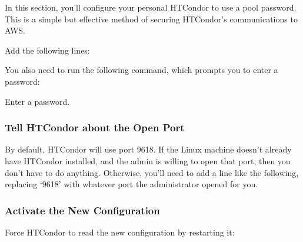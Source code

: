 In this section, you'll configure your personal HTCondor to use a pool
password.  This is a simple but effective method of securing HTCondor's
communications to AWS.

Add the following lines:


You also need to run the following command, which prompts you to enter a
password:


Enter a password.

\subsubsection{Tell HTCondor about the Open Port}

By default, HTCondor will use port 9618.  If the Linux machine doesn't already
have HTCondor installed, and the admin is willing to open that port, then you
don't have to do anything.  Otherwise, you'll need to add a line like the
following, replacing `9618' with whatever port the administrator opened for you.


\subsubsection{Activate the New Configuration}

Force HTCondor to read the new configuration by restarting it:

